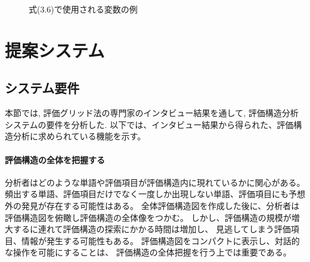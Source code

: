 \documentclass[syuuron]{kuee}
\begin{document}
		\begin{figure}
			\begin{center}
			\end{center}
			\caption{式(3.6)で使用される変数の例}
	  		\label{fig:met3}
		\end{figure}

\chapter{提案システム}
	\section{システム要件}
		本節では, 評価グリッド法の専門家のインタビュー結果\cite{hak1}を通して, 評価構造分析システムの要件を分析した. 
		以下では、インタビュー結果から得られた、評価構造分析に求められている機能を示す。
		\subsubsection{評価構造の全体を把握する}
			分析者はどのような単語や評価項目が評価構造内に現れているかに関心がある。
			頻出する単語、評価項目だけでなく一度しか出現しない単語、評価項目にも予想外の発見が存在する可能性はある。
			全体評価構造図を作成した後に、分析者は評価構造図を俯瞰し評価構造の全体像をつかむ。
			しかし、評価構造の規模が増大するに連れて評価構造の探索にかかる時間は増加し、
			見逃してしまう評価項目、情報が発生する可能性もある。
			評価構造図をコンパクトに表示し、対話的な操作を可能にすることは、
			評価構造の全体把握を行う上では重要である。
\end{document}
